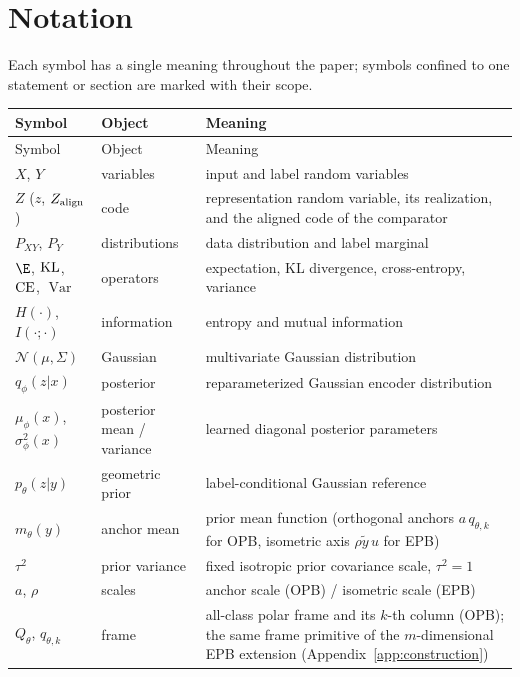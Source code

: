 \section*{Notation}

Each symbol has a single meaning throughout the paper; symbols confined to one
statement or section are marked with their scope.

\begin{center}
\small
\setlength{\tabcolsep}{4pt}
\begin{longtable}{l l p{7.5cm}}
\hline
Symbol & Object & Meaning \\
\hline
\endfirsthead
\hline
Symbol & Object & Meaning \\
\hline
\endhead
\hline
\endfoot
$X$, $Y$ & variables & input and label random variables \\
$Z$ ($z$, $Z_{\rm align}$) & code & representation random variable, its realization, and the aligned code of the comparator \\
$P_{XY}$, $P_Y$ & distributions & data distribution and label marginal \\
$\E$, $\operatorname{KL}$, $\operatorname{CE}$, $\operatorname{Var}$ & operators & expectation, KL divergence, cross-entropy, variance \\
$H(\cdot)$, $I(\cdot;\cdot)$ & information & entropy and mutual information \\
$\mathcal N(\mu,\Sigma)$ & Gaussian & multivariate Gaussian distribution \\
$q_\phi(z|x)$ & posterior & reparameterized Gaussian encoder distribution \\
$\mu_\phi(x)$, $\sigma_\phi^2(x)$ & posterior mean / variance & learned diagonal posterior parameters \\
$p_\theta(z|y)$ & geometric prior & label-conditional Gaussian reference \\
$m_\theta(y)$ & anchor mean & prior mean function (orthogonal anchors $a\,q_{\theta,k}$ for OPB, isometric axis $\rho\tilde y\,u$ for EPB) \\
$\tau^2$ & prior variance & fixed isotropic prior covariance scale, $\tau^2=1$ \\
$a$, $\rho$ & scales & anchor scale (OPB) / isometric scale (EPB) \\
$Q_\theta$, $q_{\theta,k}$ & frame & all-class polar frame and its $k$-th column (OPB); the same frame primitive of the $m$-dimensional EPB extension (Appendix~\ref{app:construction}) \\

\end{longtable}
\end{center}
